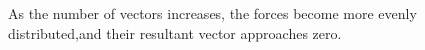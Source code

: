 \documentclass[preview]{standalone}
\begin{document}
\begin{center}
As the number of vectors increases, the forces become more evenly distributed,and their resultant vector approaches zero.
\end{center}
\end{document}
